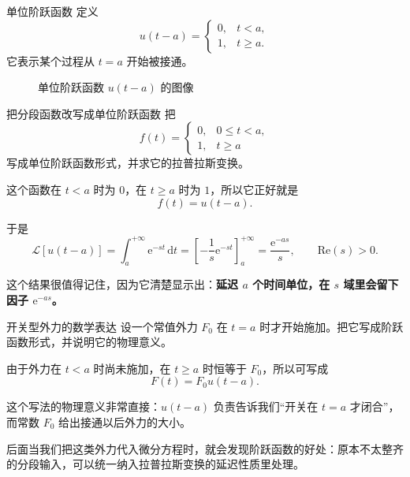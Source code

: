 \begin{dingliyi}{单位阶跃函数}{}
定义
\[
    u(t-a)=
    \begin{cases}
        0, & t<a,\\
        1, & t\ge a.
    \end{cases}
\]
它表示某个过程从 $t=a$ 开始被接通。
\end{dingliyi}

\begin{figure}[htbp]
\centering
{}
\caption{单位阶跃函数 $u(t-a)$ 的图像}
\label{fig:unit-step}
\end{figure}

\begin{lizi}{把分段函数改写成单位阶跃函数}{}
把
\[
    f(t)=
    \begin{cases}
        0, & 0\le t<a,\\
        1, & t\ge a
    \end{cases}
\]
写成单位阶跃函数形式，并求它的拉普拉斯变换。

\begin{jie}
这个函数在 $t<a$ 时为 $0$，在 $t\ge a$ 时为 $1$，所以它正好就是
\[
    f(t)=u(t-a).
\]

于是
\[
    \mathcal{L}[u(t-a)]
    =
    \int_a^{+\infty} \mathrm{e}^{-st}\,\mathrm{d}t
    =
    \left[
        -\frac{1}{s}\mathrm{e}^{-st}
    \right]_{a}^{+\infty}
    =
    \frac{\mathrm{e}^{-as}}{s},
    \qquad \mathrm{Re}(s)>0.
\]

这个结果很值得记住，因为它清楚显示出：\textbf{延迟 $a$ 个时间单位，在 $s$ 域里会留下因子 $\mathrm{e}^{-as}$。}
\end{jie}
\end{lizi}

\begin{lizi}{开关型外力的数学表达}{}
设一个常值外力 $F_0$ 在 $t=a$ 时才开始施加。把它写成阶跃函数形式，并说明它的物理意义。

\begin{jie}
由于外力在 $t<a$ 时尚未施加，在 $t\ge a$ 时恒等于 $F_0$，所以可写成
\[
    F(t)=F_0u(t-a).
\]

这个写法的物理意义非常直接：$u(t-a)$ 负责告诉我们``开关在 $t=a$ 才闭合''，而常数 $F_0$ 给出接通以后外力的大小。

后面当我们把这类外力代入微分方程时，就会发现阶跃函数的好处：原本不太整齐的分段输入，可以统一纳入拉普拉斯变换的延迟性质里处理。
\end{jie}
\end{lizi}


